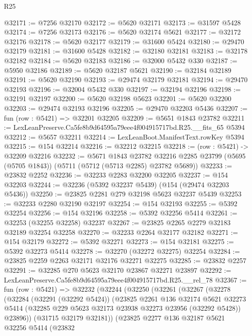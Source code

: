 \begin{lexlean}{R25}
\begin{coremodule}
@32171 := @7256 @32170
@32172 := @5620 @32171
@32173 := @31597 @5428
@32174 := @7256 @32173
@32176 := @5620 @32174 @5621
@32177 := @32172 @32176
@32178 := @5620 @32177
@32179 := @31600 @5424
@32180 := @29470 @32179
@32181 := @31600 @5428
@32182 := @32180 @32181
@32183 := @32178 @32182
@32184 := @5620 @32183
@32186 := @32000 @5432 @330
@32187 := @5950 @32186
@32189 := @5620 @32187 @5621
@32190 := @32184 @32189
@32191 := @5620 @32190
@32193 := @29474 @32179 @32181
@32194 := @29470 @32193
@32196 := @32004 @5432 @330
@32197 := @32194 @32196
@32198 := @32191 @32197
@32200 := @5620 @32198 @5623
@32201 := @5620 @32200
@32203 := @29474 @32193 @32196
@32205 := @29470 @32203 @5436
@32207 := fun (row : @5421) => @32201 @32205
@32209 := @5651 @1843 @23782
@32211 := LexLeanPreserve.Ca5fe8b9d64595a79eee4f004915717bd.R25.__fits_65 @5394
@32212 := @5657 @32211
@32214 := LexLeanBoot.ManifestText.rowKey @5394
@32215 := @154 @32214
@32216 := @32212 @32215
@32218 := (row : @5421) -> @32209 @32216
@32232 := @5671
    @1843
    @23782
    @32216
    @2285
    @23799
    (@5695 (@5705 @1843))
    (@5711 (@5712 (@5713 @2285) @23782 @5689))
@32233 := @23832 @2252
@32236 := @32233 @2283 @32200 @32205
@32237 := @154 @32203
@32244 := @32236 (@5392 @32237 @5439) (@154 (@29474 @32203 @5436))
@32250 := @23825 @2281 @279 @32198 @5623 @32237 @5439
@32253 := @32233 @2280 @32190 @32197
@32254 := @154 @32193
@32255 := @5392 @32254
@32256 := @154 @32196
@32258 := @5392 @32256 @5414
@32261 := @32253 (@32255 @32258) @32237
@32267 := @23825 @2265 @2279 @32183 @32189 @32254 @32258
@32270 := @32233 @2264 @32177 @32182
@32271 := @154 @32179
@32272 := @5392 @32271
@32273 := @154 @32181
@32275 := @5392 @32273 @5414
@32278 := @32270 (@32272 @32275) @32254
@32284 := @23825 @2259 @2263 @32171 @32176 @32271 @32275
@32285 := @23832 @2257
@32291 := @32285 @270 @5623 @32170 @23867 @32271 @23897
@32292 := LexLeanPreserve.Ca5fe8b9d64595a79eee4f004915717bd.R25.__rel_78
@32367 := fun (row : @5421) =>
  @32232
    (@32244
      (@32250
        (@32261
          (@32267
            (@32278
              (@32284
                (@32291 (@32292 @5424))
                (@23825
                  @2261
                  @136
                  @32174
                  @5621
                  @32273
                  @5414
                  (@32285 @229 @5623 @32173 @23938 @32273 @23956 (@32292 @5428))
                  @23896))
              (@31715 @32179 @32181))
            (@23825
              @2277
              @136
              @32187
              @5621
              @32256
              @5414
              (@23832

\end{coremodule}
\end{lexlean}
